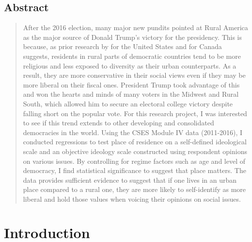 \documentclass[12pt, titlepage]{article}
\title{\tb{Place of Residence and Political Attitudes in Democracies Worldwide }}
\author{Jennifer Lin}
\affil{New College of Florida}
\begin{document}
\begin{singlespace}
\maketitle
\end{singlespace}

\begin{center} %
\section*{Abstract} %
	
\begin{quote}
After the 2016 election, many major new pundits pointed at Rural America as the major source of Donald Trump’s victory for the presidency. This is because, as prior research by \cite{walsh_putting_2012} for the United States and \cite{walks_city-suburban_2005} for Canada suggests, residents in rural parts of democratic countries tend to be more religious and less exposed to diversity as their urban counterparts. As a result, they are more conservative in their social views even if they may be more liberal on their fiscal ones. President Trump took advantage of this and won the hearts and minds of many voters in the Midwest and Rural South, which allowed him to secure an electoral college victory despite falling short on the popular vote. For this research project, I was interested to see if this trend extends to other developing and consolidated democracies in the world. Using the CSES Module IV data (2011-2016), I conducted regressions to test place of residence on a self-defined ideological scale and an objective ideology scale constructed using respondent opinions on various issues. By controlling for regime factors such as age and level of democracy, I find statistical significance to suggest that place matters. The data provides sufficient evidence to suggest that if one lives in an urban place compared to a rural one, they are more likely to self-identify as more liberal and hold those values when voicing their opinions on social issues.

\end{quote}
\end{center}

\clearpage

\section{Introduction}
\end{document}
